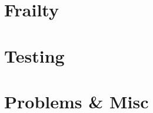 \documentclass{article}
\begin{document}
\newpage

\section*{Frailty}

\newpage

\section*{Testing}

\newpage

\section*{Problems \& Misc}
\end{document}
